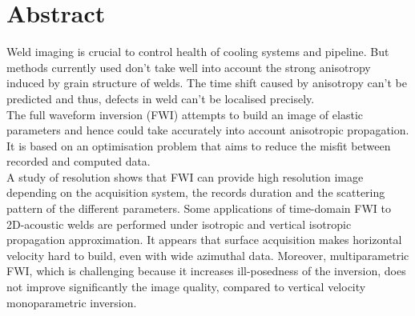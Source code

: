 \section*{Abstract}

Weld imaging is crucial to control health of cooling systems and pipeline. But methods currently used don't take well into account the strong anisotropy induced by grain structure of welds. The time shift caused by anisotropy can't be predicted and thus, defects in weld can't be localised precisely. \\

The full waveform inversion (FWI) attempts to build an image of elastic parameters and hence could take accurately into account anisotropic propagation. It is based on an optimisation problem that aims to reduce the misfit between recorded and computed data. \\

A study of resolution shows that FWI can provide high resolution image depending on the acquisition system, the records duration and the scattering pattern of the different parameters. Some applications of time-domain FWI to 2D-acoustic welds are performed under isotropic and vertical isotropic propagation approximation. It appears that surface acquisition makes horizontal velocity hard to build, even with wide azimuthal data. Moreover, multiparametric FWI, which is challenging because it increases ill-posedness of the inversion, does not improve significantly the image quality, compared to vertical velocity monoparametric inversion.


